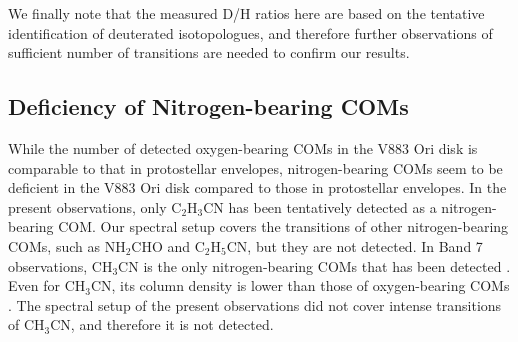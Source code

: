 \documentclass[twocolumn, twocolappendix, astrosymb, times]{aastex631}
\newcommand{\methanol}{CH$_3$OH\xspace}
\newcommand{\acetaldehyde}{CH$_3$CHO\xspace}
\newcommand{\methylformate}{CH$_3$OCHO\xspace}
\begin{document}
We finally note that the measured D/H ratios here are based on the tentative identification of deuterated isotopologues, and therefore further observations of sufficient number of transitions are needed to confirm our results. 




\begin{figure*}
\caption{The KDE of the posterior probability density distributions of column density ratios of deuterated to normal isotopologues for \methanol (blue), \acetaldehyde (orange), and \methylformate (green). For \acetaldehyde and \methylformate, two different isomers of deuterated species (CH$_3$CDO and CH$_2$DCHO) have been observed. The probability density is normalized by the peak being unity and offset for visual clarity. The gray-shaded region indicates the range of typical values for CH$_2$DOH/\methanol ratios measured in warm protostellar envelopes. Note that the statistical corrections have not been applied for CH$_2$DOCHO and CH$_2$DCHO which contain three equivalent hydrogen atoms in their CH$_3$- functional groups.}
\label{fig:DH}
\end{figure*}

\subsection{Deficiency of Nitrogen-bearing COMs}
While the number of detected oxygen-bearing COMs in the V883 Ori disk is comparable to that in protostellar envelopes, nitrogen-bearing COMs seem to be deficient in the V883 Ori disk compared to those in protostellar envelopes. In the present observations, 
only C$_2$H$_3$CN has been tentatively detected as a nitrogen-bearing COM. Our spectral setup covers the transitions of other nitrogen-bearing COMs, such as NH$_2$CHO and C$_2$H$_5$CN, but they are not detected. In Band 7 observations, CH$_3$CN is the only nitrogen-bearing COMs that has been detected \citep{Lee2019}. Even for CH$_3$CN, its column density is lower than those of oxygen-bearing COMs \citep{Lee2019}. The spectral setup of the present observations did not cover intense transitions of CH$_3$CN, and therefore it is not detected. 
\end{document}
